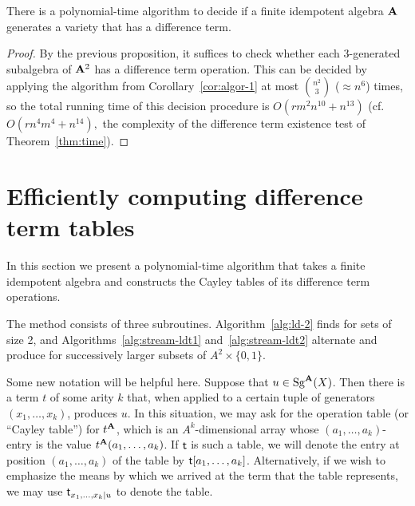 \begin{corollary}
  There is a polynomial-time algorithm to decide if a finite idempotent algebra $\mathbf{A}$ generates a variety that has a difference term.
\end{corollary}

\begin{proof}
  By the previous proposition, it suffices to check whether each 3-generated subalgebra of 
  $\mathbf{A}^2$ has a difference term operation. This can be decided by applying the 
  algorithm from Corollary~\ref{cor:algor-1} at most $\binom{n^2}{3}$ ($\approx n^6$) times, 
  so the total running time of this decision procedure is $O(rm^2n^{10} + n^{13})$ (cf.~$O(rn^4m^4 + n^{14}),$ 
  the complexity of the difference term existence test of Theorem~\ref{thm:time}).
\end{proof}

\section{Efficiently computing difference term tables}
\label{sec:comp-diff-term}
In this section we present a polynomial-time algorithm that takes 
a finite idempotent algebra and constructs the Cayley tables of 
its difference term operations.

The method consists of three subroutines.
Algorithm~\ref{alg:ld-2} finds \ldtos for sets
of size 2, and Algorithms~\ref{alg:stream-ldt1} and~\ref{alg:stream-ldt2}
alternate and produce \ldtos for successively larger subsets of $A^2 \times \{0,1\}$.

Some new notation will be helpful here.  Suppose that $ u \in \operatorname{Sg}^{\mathbf{A}}(X)$.
Then there is a term $t$ of some arity $k$ that, when applied to a certain tuple of 
generators $(x_1, \dots, x_k)$, produces $u$.  
In this situation, we may ask for the operation table (or ``Cayley table'') 
for $t^{\mathbf{A}}$, which is an $A^k$-dimensional array whose $(a_1, \dots, a_k)$-entry
is the value $t^{\mathbf{A}}(a_1, \dots, a_k)$. 
If $\mathsf{t}$ is such a table, we will denote the 
entry at position $(a_1, \dots, a_k)$ of the table by $\mathsf{t}[a_1, \dots, a_k]$.
Alternatively, if we wish to emphasize the means by which 
we arrived at the term that the table represents, we may use
$\mathsf{t}_{x_1,\dots, x_k \mid u}$ to denote the table.

\newcommand{\triple}{\ensuremath{(a_0,a_1),(b_0,a_1),(b_0,b_1)}}

